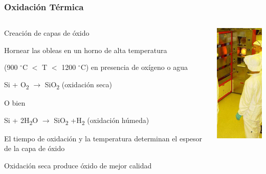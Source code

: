 \documentclass[aspectratio=169,10pt]{beamer}
\begin{document}
\begin{frame}
\frametitle{Oxidación Térmica}
\begin{columns}
\begin{column}{0.75\textwidth}
	Creación de capas de óxido
	
	\vspace{3mm}
	Hornear las obleas en un horno de alta temperatura 
	
	(900 $^\circ$C $<$ T $<$ 1200 $^\circ$C) en presencia de oxígeno o agua
	
	\vspace{5mm}\centering
	Si + O\textsubscript{2} $\rightarrow$ SiO\textsubscript{2} (oxidación seca)
	
	\vspace{3mm}
	O bien
	
	\vspace{3mm}
	Si + 2H\textsubscript{2}O $\rightarrow$ SiO\textsubscript{2} +H\textsubscript{2} (oxidación húmeda)
	
	\vspace{5mm}\raggedright
	El tiempo de oxidación y la temperatura determinan el espesor de la capa de óxido
	
	\vspace{3mm}
	Oxidación seca produce óxido de mejor calidad
\end{column}
\begin{column}{0.25\textwidth}
	\centering
	\includegraphics[width=3cm]{thermalSiO2}
\end{column}
\end{columns}
\end{frame}
\end{document}
